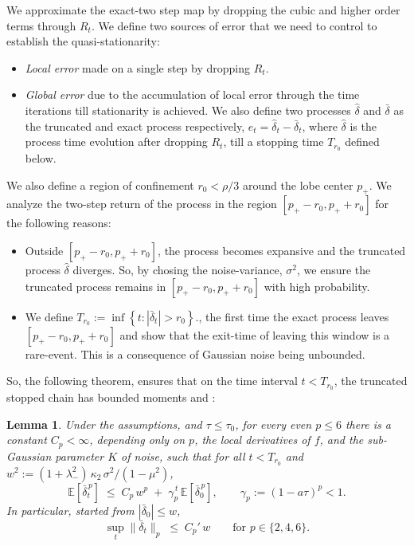 \documentclass{article} %
\theoremstyle{plain}
\newtheorem{lemma}{Lemma}
\theoremstyle{definition}
\begin{document}
\begin{itemize}[nosep,leftmargin=*]
We approximate the exact-two step map by dropping the cubic and higher order terms through $R_{t}$. We define two sources of error that we need to control to establish the quasi-stationarity:
\begin{itemize}
    \item \textit{Local error} made on a single step by dropping $R_{t}$.
    \item \textit{Global error} due to the accumulation of local error through the time iterations till stationarity is achieved. We also define two processes $\hat{\delta}$ and $\bar{\delta}$ as the truncated and exact process respectively, $e_{t}= \hat{\delta}_{t} - \bar{\delta}_{t}$, where $\hat{\delta}$ is the process time evolution after dropping  $R_{t}$, till a stopping time $T_{r_0}$ defined below. 
\end{itemize}
We also define a region of confinement $r_{0}<\rho/3$ around the lobe center $p_{+}$. We analyze the two-step return of the process in the region $[p_{+}-r_{0},p_{+}+r_{0}]$ for the following reasons:
\begin{itemize}
    \item Outside $[p_{+}-r_{0},p_{+}+r_{0}]$, the process becomes expansive and the truncated process $\hat{\delta}$ diverges. So, by chosing the noise-variance, $\sigma^2$, we ensure the truncated process remains in $[p_{+}-r_{0},p_{+}+r_{0}]$ with high probability. 
    \item We define $T_{r_0} := \inf \left\{ t : |\bar{\delta}_{t}| > r_0 \right\}.$, the first time the exact process leaves $[p_{+}-r_{0},p_{+}+r_{0}]$ and show that the exit-time of leaving this window is a rare-event. This is a consequence of Gaussian noise being unbounded. 
\end{itemize}



So, the following theorem, ensures that on the time interval $t<T_{r_0} $, the truncated stopped chain has bounded moments and :


\begin{lemma}
Under the assumptions, and $\tau\le\tau_0$, for every even
$p\le 6$ there is a constant $C_p<\infty$, depending only on $p$, the local
derivatives of $f$, and the sub-Gaussian parameter $K$ of noise, such that
for all $t< T_{r_{0}}$ and $w^2 := (1+\lambda_-^2)\,\kappa_2\,\sigma^2/(1-\mu^2)$,
\[
  \mathbb{E}\!\left[\bar\delta_t^{\,p}\right]
  \;\le\; C_p\,w^p \;+\; \gamma_p^{\,t}\,\mathbb{E}\!\left[\bar\delta_0^{\,p}\right],
  \qquad \gamma_p := (1-a\tau)^p < 1 .
\]
In particular, started from $|\bar\delta_0|\le w$,
\[
  \sup_t \bigl\|\bar\delta_t\bigr\|_p \;\le\; C_p'\,w
  \qquad\text{for } p\in\{2,4,6\}.
\]
\end{lemma}



\end{itemize}
\end{document}

